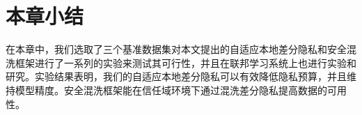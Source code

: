 \section{本章小结}
在本章中，我们选取了三个基准数据集对本文提出的自适应本地差分隐私和安全混洗框架进行了一系列的实验来测试其可行性，并且在联邦学习系统上也进行实验和研究。实验结果表明，我们的自适应本地差分隐私可以有效降低隐私预算，并且维持模型精度。安全混洗框架能在信任域环境下通过混洗差分隐私提高数据的可用性。

